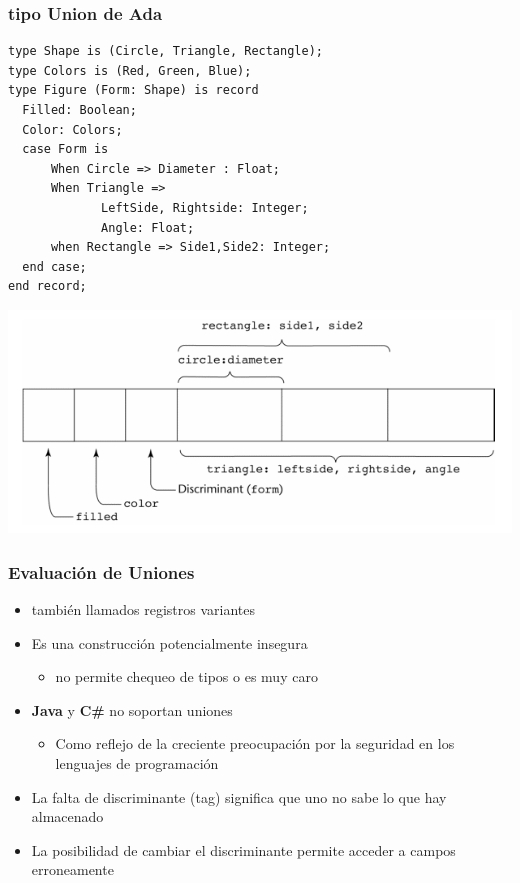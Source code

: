 \documentclass[11pt]{article}
\begin{document}
\subsubsection*{tipo Union de Ada}
\label{sec:orgheadline38}
\begin{verbatim}
type Shape is (Circle, Triangle, Rectangle);
type Colors is (Red, Green, Blue);
type Figure (Form: Shape) is record
  Filled: Boolean;
  Color: Colors;
  case Form is 
      When Circle => Diameter : Float;
      When Triangle => 
             LeftSide, Rightside: Integer;
             Angle: Float;
      when Rectangle => Side1,Side2: Integer;
  end case;
end record;
\end{verbatim}
\includegraphics[width=.9\linewidth]{adaunion.png}

\subsubsection*{Evaluación de Uniones}
\label{sec:orgheadline39}
\begin{itemize}
\item también llamados registros variantes
\item Es una construcción potencialmente insegura
\begin{itemize}
\item no permite chequeo de tipos o es muy caro
\end{itemize}
\item \textbf{Java} y \textbf{C\#} no soportan uniones
\begin{itemize}
\item Como reflejo de la creciente preocupación por la seguridad en los lenguajes de programación
\end{itemize}
\item La falta de discriminante (tag) significa que uno no sabe lo que hay almacenado
\item La posibilidad de cambiar el discriminante permite acceder a campos erroneamente
\end{itemize}
\end{document}

